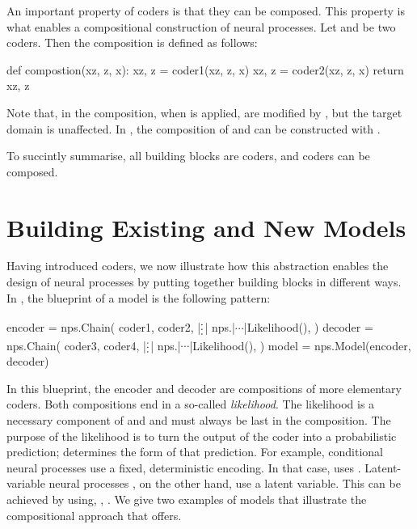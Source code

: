 \documentclass[12pt, twoside]{report}
\begin{document}

An important property of coders is that they can be composed.
This property is what enables a compositional construction of neural processes.
Let  and  be two coders.
Then the composition is defined as follows:
\begin{pythoncode}{\small}{}
def compostion(xz, z, x):
    xz, z = coder1(xz, z, x)
    xz, z = coder2(xz, z, x)
    return xz, z
\end{pythoncode}
Note that, in the composition, when  is applied,  are modified by , but the target domain  is unaffected.
In , the composition of  and  can be constructed with .

To succintly summarise, all building blocks are coders, and coders can be composed.

\section{Building Existing and New Models}
\label{sec:software:examples}

Having introduced coders, we now illustrate how this abstraction enables the design of neural processes by putting together building blocks in different ways.
In ,
the blueprint of a model is the following pattern:
\begin{pythoncode}{\small}{}
encoder = nps.Chain(
   coder1,
   coder2,
   |$\raisebox{-3pt}{\vdots}$|
   nps.|$\cdots$|Likelihood(),
)
decoder = nps.Chain(
   coder3,
   coder4,
   |$\raisebox{-3pt}{\vdots}$|
   nps.|$\cdots$|Likelihood(),
)
model = nps.Model(encoder, decoder)
\end{pythoncode}
In this blueprint, the encoder and decoder are compositions of more elementary coders.
Both compositions end in a so-called \emph{likelihood}.
The likelihood is a necessary component of  and 
and must always be last in the composition.
The purpose of the likelihood is to turn the output of the coder into a probabilistic prediction;
 determines the form of that prediction.
For example, conditional neural processes \parencite[CNPs;][]{Garnelo:2018:Conditional_Neural_Processes} use a fixed, deterministic encoding.
In that case,  uses .
Latent-variable neural processes \parencite[LNPs;][]{Garnelo:2018:Neural_Processes},
on the other hand, use a latent variable.
This can be achieved by using, \eg, .
We give two examples of models that illustrate the compositional approach that  offers.
\end{document}
